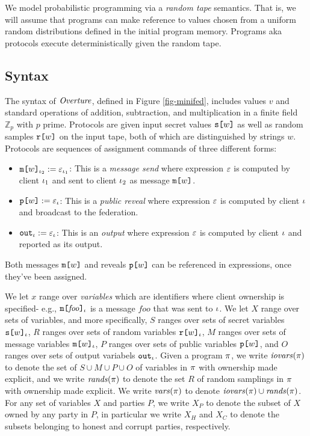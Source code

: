 We model probabilistic programming via a \emph{random tape}
semantics. That is, we will assume that programs can make reference to
values chosen from a uniform random distributions defined in the
initial program memory.  Programs aka protocols execute
deterministically given the random tape.

\subsection{Syntax} The syntax of $\mathit{Overture}$, defined in
Figure \ref{fig-minifed}, includes values $v$ and standard
operations of addition, subtraction, and multiplication in
a finite field $\mathbb{Z}_p$ with $p$ prime. 
Protocols are given input secret values $\texttt{s[}w\texttt{]}$
as well as random samples $\texttt{r[}w\texttt{]}$ on the input
tape, both of which are distinguished by
strings $w$. Protocols are sequences of assignment
commands of three different forms:
\begin{itemize}
\item $\texttt{m[}w\texttt{]}_{\iota_2} := \varepsilon_{\iota_1}$: This
  is a \emph{message send} where expression $\varepsilon$ is computed
  by client $\iota_1$ and sent to client $\iota_2$ as message
  $\texttt{m[}w\texttt{]}$.
\item $\texttt{p[}w\texttt{]} := \varepsilon_{\iota}$: This
  is a \emph{public reveal} where expression $\varepsilon$ is computed
  by client $\iota$ and broadcast to the federation.
\item $\texttt{out}_{\iota} := \varepsilon_{\iota}$: This
  is an \emph{output} where expression $\varepsilon$ is computed
  by client $\iota$ and reported as its output.
\end{itemize}
Both messages $\texttt{m[}w\texttt{]}$ and reveals $\texttt{p[}w\texttt{]}$ can be
referenced in expressions, once they've been assigned.

We let $x$ range over \emph{variables}  which are identifiers
where client ownership is specified- e.g., $\texttt{m[}\mathit{foo}\texttt{]}_{\iota}$
is a message $\mathit{foo}$ that was sent to $\iota$. We let $X$
range over sets of variables, and more specifically, $S$ ranges over sets of secret variables $\texttt{s[}w\texttt{]}_{\iota}$, $R$ ranges over sets of random variables $\texttt{r[}w\texttt{]}_{\iota}$, $M$ ranges over sets of message variables $\texttt{m[}w\texttt{]}_{\iota}$, $P$ ranges over sets of public variables $\texttt{p[}w\texttt{]}$, and $O$ ranges over sets of output variabels $\texttt{out}_{\iota}$.
Given a program $\pi$, we write $\mathit{iovars}(\pi)$ to
denote the set of $S \cup M \cup P \cup O$ of variables in $\pi$
with ownership made explicit, and we write $\mathit{rands}(\pi)$ to
denote the set $R$ of random samplings in $\pi$ with ownership
made explicit. We write
$\mathit{vars}(\pi)$ to denote $\mathit{iovars}(\pi) \cup \mathit{rands}(\pi)$. For any set
of variables $X$ and parties $P$, we write $X_P$ to denote the subset
of $X$ owned by any party in $P$, in particular we write $X_H$ and $X_C$ to
denote the subsets belonging to honest and corrupt parties,
respectively.

